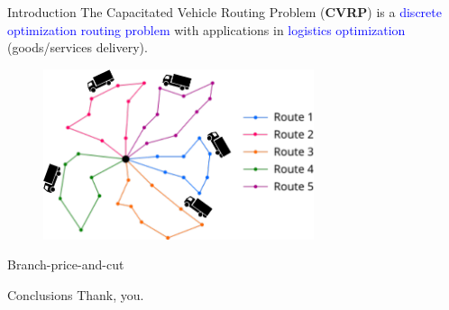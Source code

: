 \begin{frame}
	\maketitle
\end{frame}

\begin{frame}{Introduction}
	The Capacitated Vehicle Routing Problem (\textbf{CVRP}) is a \textcolor{blue}{discrete optimization routing problem} with applications in \textcolor{blue}{logistics optimization} (goods/services delivery).

	\begin{figure}[b]
		\centering
		\includegraphics[height=5cm]{Imgs/CVRP-example-without-truck.out.cropped.pdf}
	\end{figure}

\end{frame}

\begin{frame}{Branch-price-and-cut}
\end{frame}

\begin{frame}{Conclusions}
	Thank, you.

	\cite{jepsen2014}
\end{frame}

\begin{frame}
	\maketitle
\end{frame}
